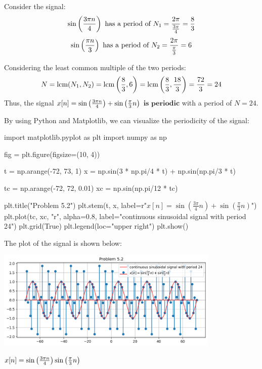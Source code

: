 \documentclass[a4paper, 10pt]{article}
\begin{document}
\begin{solution}
Consider the signal:
\[
    \sin \left( \frac{3\pi n}{4} \right) \text{ has a period of } N_1 = \frac{2\pi}{\frac{3\pi}{4}} = \frac{8}{3}
\]
\[
    \sin \left( \frac{\pi n}{3} \right) \text{ has a period of } N_2 = \frac{2\pi}{\frac{\pi}{3}} = 6
\]

Considering the least common multiple of the two periods:
\[
    N = \text{lcm}(N_1, N_2) = \text{lcm}\left(\frac{8}{3}, 6\right) = \text{lcm}\left(\frac{8}{3}, \frac{18}{3}\right) = \frac{72}{3} = 24
\]
Thus, the signal \( x[n] = \sin \left( \frac{3\pi n}{4} \right) + \sin\left( \frac{\pi}{3}n \right) \) \( \boxed{\textbf{is periodic}} \) with a period of \( \boxed{N = 24} \).

\vspace{5mm}

By using Python and Matplotlib, we can visualize the periodicity of the signal:
\begin{codingbox}
import matplotlib.pyplot as plt
import numpy as np

fig = plt.figure(figsize=(10, 4))

t = np.arange(-72, 73, 1)
x = np.sin(3 * np.pi/4 * t) + np.sin(np.pi/3 * t)

tc = np.arange(-72, 72, 0.01)
xc = np.sin(np.pi/12 * tc)

plt.title("Problem 5.2")
plt.stem(t, x, label=r"$x[n] = \sin(\frac{3\pi}{4}n) + \sin(\frac{\pi}{3}n)$")
plt.plot(tc, xc, "r", alpha=0.8, label="continuous sinusoidal signal with period 24")
plt.grid(True)
plt.legend(loc="upper right")
plt.show()
\end{codingbox}

The plot of the signal is shown below:
\begin{center}
    \includegraphics[width=0.8\textwidth]{images/problem_5_2.png}
\end{center}
\end{solution}

\newpage

\begin{subproblems}[start=3]
    \item \( x[n] = \sin \left( \frac{3\pi n}{4} \right)\sin\left( \frac{\pi}{3}n \right) \)
\end{subproblems}
\end{document}

